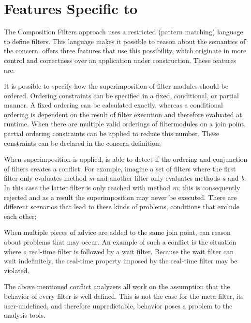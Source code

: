 \section{Features Specific to \Compose*{}}
\label{section:FSTC}
The Composition Filters approach uses a restricted (pattern matching) language to define filters. This language makes it possible to reason about the semantics of the concern. 
\Compose* offers three features that use this possibility, which originate in more control and correctness over an application under construction. These features are:
\begin{description}[style=nextline,noitemsep]
\item [Ordering of filter modules] It is possible to specify how the superimposition of filter modules should be ordered. Ordering constraints can be specified in a fixed, conditional, or partial manner. A fixed ordering can be calculated exactly, whereas a conditional ordering is dependent on the result of filter execution and therefore evaluated at runtime. When there are multiple valid orderings of filtermodules on a join point, partial ordering constraints can be applied to reduce this number. These constraints can be declared in the concern definition;
\item [Filter consistency checking] When superimposition is applied, \Compose* is able to detect if the ordering and conjunction of filters creates a conflict. 
For example, imagine a set of filters where the first filter only evaluates method \emph{m} and another filter only evaluates methods \emph{a} and \emph{b}. 
In this case the latter filter is only reached with method \emph{m}; this is consequently rejected and as a result the superimposition may never be executed. There are different scenarios that lead to these kinds of problems, \eg conditions that exclude each other;
\item [Reason about semantic problems] When multiple pieces of advice are added to the same join point, \Compose* can reason about problems that may occur.
An example of such a conflict is the situation where a real-time filter is followed by a wait filter. Because the wait filter can wait indefinitely, the real-time property imposed by the real-time filter may be violated.
\end{description}
The above mentioned conflict analyzers all work on the assumption that the behavior of every filter is well-defined. This is not the case for the meta filter, its user-undefined, and therefore unpredictable, behavior poses a problem to the analysis tools. 

